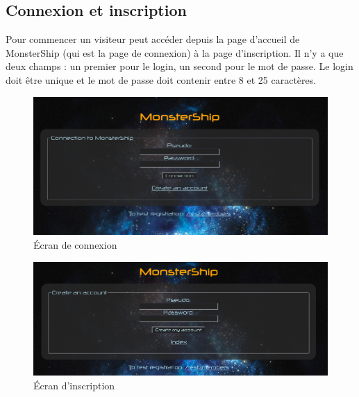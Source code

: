 \documentclass[a4paper,11pt]{report}
\begin{document}
    \subsection{Connexion et inscription}
      Pour commencer un visiteur peut accéder depuis la page d'accueil de MonsterShip (qui est la page de connexion) à la page d'inscription. Il n'y a que deux champs : un premier pour le login, un second pour le mot de passe. Le login doit être unique et le mot de passe doit contenir entre 8 et 25 caractères.
      \begin{figure}[H]
        \begin{center}
          \includegraphics[width=.8\textwidth]{images/connexion.png}
          \caption{Écran de connexion}
          \label{fig:ec_co}
        \end{center}
      \end{figure}
      \begin{figure}[H]
        \begin{center}
          \includegraphics[width=.8\textwidth]{images/inscription.png}
          \caption{Écran d'inscription}
          \label{fig:ec_inc}
        \end{center}
      \end{figure}
\end{document}

